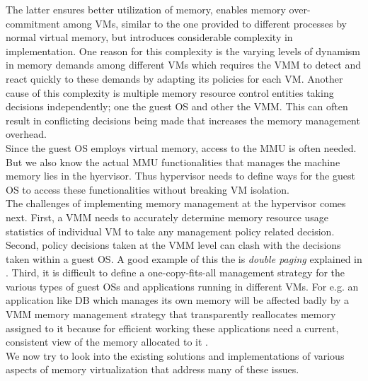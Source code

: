 The latter ensures better utilization of memory, enables memory over-commitment among VMs, similar
to the one provided to different processes by normal virtual memory, but introduces considerable
complexity in implementation. One reason for this complexity is the varying levels of dynamism in
memory demands among different VMs which requires the VMM to detect and react quickly to these
demands by adapting its policies for each VM. Another cause of this complexity is multiple memory
resource control entities taking decisions independently; one the guest OS and other the VMM. This
can often result in conflicting decisions being made that increases the memory management
overhead.\\
Since the guest OS employs virtual memory, access to the MMU is often needed. But we also know the
actual MMU functionalities that manages the machine memory lies in the hyervisor. Thus hypervisor
needs to define ways for the guest OS to access these functionalities without breaking VM
isolation.\\
The challenges of implementing memory management at the hypervisor comes next. First, a VMM needs
to accurately determine memory resource usage statistics of individual VM to take any management
policy related decision. Second, policy decisions taken at the VMM level can clash with the
decisions taken within a guest OS. A good example of this the is \textit{double paging} explained
in \citet{waldspurger2002memory}. Third, it is difficult to define a one-copy-fits-all management
strategy for the various types of guest OSs and applications running in different VMs. For e.g. an
application like DB which manages its own memory will be affected badly by a VMM memory management
strategy that transparently reallocates memory assigned to it because for efficient working these
applications need a current, consistent view of the memory allocated to it
\citep{salomie2013application}.\\ 
We now try to look into the existing solutions and implementations of various aspects of memory
virtualization that address many of these issues. 
